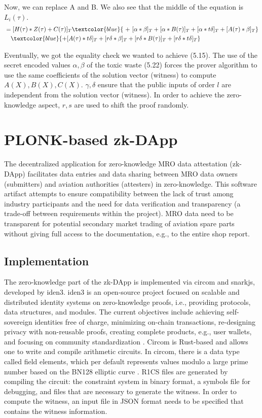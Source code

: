 Now, we can replace A and B. We also see that the middle of the equation is \(L_i(\tau)\).
 \begin{equation*}
     \begin{split}
     &=[H(\tau) * Z(\tau) + C(\tau)]_T \textcolor{blue}{\ +\  [\alpha * \beta]_T + [\alpha * B(\tau)]_T + [\alpha * t\delta]_T + [A(\tau) * \beta]_T} \\
     &\ \ \ \textcolor{blue}{+ [A(\tau) * t\delta]_T + [r\delta * \beta]_T + [r\delta * B(\tau)]_T + [r\delta * t\delta]_T}
     \end{split}
 \end{equation*}

Eventually, we got the equality check we wanted to achieve (5.15). The use of the secret encoded values \(\alpha, \beta\) of the toxic waste (5.22) forces the prover algorithm to use the same coefficients of the solution vector (witness) to compute \(A(X), B(X), C(X)\). \(\gamma, \delta\) ensure that the public inputs of order \(l\) are independent from the solution vector (witness). In order to achieve the zero-knowledge aspect, \(r, s\) are used to shift the proof randomly.

\section{PLONK-based zk-DApp}
The decentralized application for zero-knowledge MRO data attestation (zk-DApp) facilitates data entries and data sharing between MRO data owners (submitters) and aviation authorities (attesters) in zero-knowledge. This software artifact attempts to ensure compatibility between the lack of trust among industry participants and the need for data verification and transparency (a trade-off between requirements within the project). MRO data need to be transparent for potential secondary market trading of aviation spare parts without giving full access to the documentation, e.g., to the entire shop report.

\subsection{Implementation}
The zero-knowledge part of the zk-DApp is implemented via circom and snarkjs, developed by iden3. iden3 is an open-source project focused on scalable and distributed identity systems on zero-knowledge proofs, i.e., providing protocols, data structures, and modules. The current objectives include achieving self-sovereign identities free of charge, minimizing on-chain transactions, re-designing privacy with non-reusable proofs, creating complete products, e.g., user wallets, and focusing on community standardization \citep{iden3aboutus}. Circom is Rust-based and allows one to write and compile arithmetic circuits. In circom, there is a data type called field elements, which per default represents values modulo a large prime number based on the BN128 elliptic curve \citep{circom}. R1CS files are generated by compiling the circuit: the constraint system in binary format, a symbols file for debugging, and files that are necessary to generate the witness. In order to compute the witness, an input file in JSON format needs to be specified that contains the witness information. 

